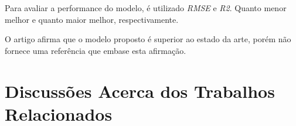 Para avaliar a performance do modelo, é utilizado \textit{\acrshort{RMSE}} e \textit{\acrfull{R2}}. Quanto menor melhor e quanto maior melhor, respectivamente. 

O artigo afirma que o modelo proposto é superior ao estado da arte, porém não fornece uma referência que embase esta afirmação.

\section{Discussões Acerca dos Trabalhos Relacionados}